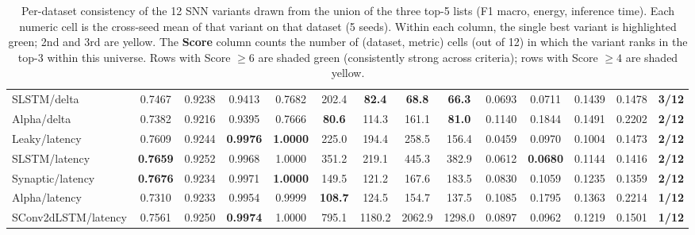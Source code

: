 \begin{table}[t]
{\begin{tabular}{l|cccc|cccc|cccc|c}
SLSTM/delta & 0.7467 & 0.9238 & 0.9413 & 0.7682 & 202.4 & \cellcolor{paretogreen}\textbf{82.4} & \cellcolor{paretogreen}\textbf{68.8} & \cellcolor{paretogreen}\textbf{66.3} & 0.0693 & 0.0711 & 0.1439 & 0.1478 & \textbf{3/12} \\
Alpha/delta & 0.7382 & 0.9216 & 0.9395 & 0.7666 & \cellcolor{paretogreen}\textbf{80.6} & 114.3 & 161.1 & \cellcolor{paretoyellow}\textbf{81.0} & 0.1140 & 0.1844 & 0.1491 & 0.2202 & \textbf{2/12} \\
Leaky/latency & 0.7609 & 0.9244 & \cellcolor{paretoyellow}\textbf{0.9976} & \cellcolor{paretoyellow}\textbf{1.0000} & 225.0 & 194.4 & 258.5 & 156.4 & 0.0459 & 0.0970 & 0.1004 & 0.1473 & \textbf{2/12} \\
SLSTM/latency & \cellcolor{paretoyellow}\textbf{0.7659} & 0.9252 & 0.9968 & 1.0000 & 351.2 & 219.1 & 445.3 & 382.9 & 0.0612 & \cellcolor{paretoyellow}\textbf{0.0680} & 0.1144 & 0.1416 & \textbf{2/12} \\
Synaptic/latency & \cellcolor{paretogreen}\textbf{0.7676} & 0.9234 & 0.9971 & \cellcolor{paretoyellow}\textbf{1.0000} & 149.5 & 121.2 & 167.6 & 183.5 & 0.0830 & 0.1059 & 0.1235 & 0.1359 & \textbf{2/12} \\
Alpha/latency & 0.7310 & 0.9233 & 0.9954 & 0.9999 & \cellcolor{paretoyellow}\textbf{108.7} & 124.5 & 154.7 & 137.5 & 0.1085 & 0.1795 & 0.1363 & 0.2214 & \textbf{1/12} \\
SConv2dLSTM/latency & 0.7561 & 0.9250 & \cellcolor{paretoyellow}\textbf{0.9974} & 1.0000 & 795.1 & 1180.2 & 2062.9 & 1298.0 & 0.0897 & 0.0962 & 0.1219 & 0.1501 & \textbf{1/12} \\
\bottomrule
\end{tabular}%
}
\caption{Per-dataset consistency of the 12 SNN variants drawn from the union of the three top-5 lists (F1 macro, energy, inference time). Each numeric cell is the cross-seed mean of that variant on that dataset (5 seeds). Within each column, the single best variant is highlighted \colorbox{paretogreen}{green}; 2nd and 3rd are \colorbox{paretoyellow}{yellow}. The \textbf{Score} column counts the number of (dataset, metric) cells (out of 12) in which the variant ranks in the top-3 within this universe. Rows with Score $\geq 6$ are shaded \colorbox{paretogreen!40}{green} (consistently strong across criteria); rows with Score $\geq 4$ are shaded \colorbox{paretoyellow!40}{yellow}.}
\label{tab:consistency}
\end{table}
